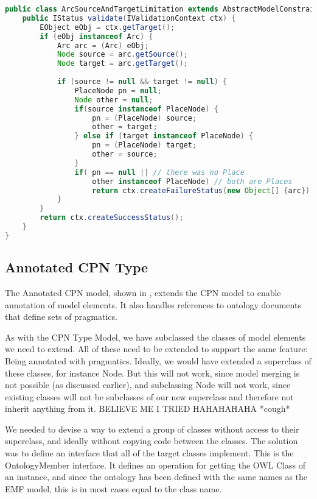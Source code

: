 \begin{lstlisting}[language=Java,label=lst:constraintimpl,float,
caption=Constraint Implementation]
public class ArcSourceAndTargetLimitation extends AbstractModelConstraint {
	public IStatus validate(IValidationContext ctx) {
		EObject eObj = ctx.getTarget();
		if (eObj instanceof Arc) {
			Arc arc = (Arc) eObj;
			Node source = arc.getSource();
			Node target = arc.getTarget();
			
			if (source != null && target != null) {
				PlaceNode pn = null;
				Node other = null;
				if(source instanceof PlaceNode) {
					pn = (PlaceNode) source;
					other = target;
				} else if (target instanceof PlaceNode) {
					pn = (PlaceNode) target;
					other = source;
				}
				if(	pn == null || // there was no Place
					other instanceof PlaceNode) // both are Places
					return ctx.createFailureStatus(new Object[] {arc});
			} 
		} 
		return ctx.createSuccessStatus();
	}
}
\end{lstlisting}

\subsection{Annotated CPN Type}
The Annotated CPN model, shown in , extends the CPN
model to enable annotation of model elements. It also handles references
to ontology documents that define sets of pragmatics.


As with the CPN Type Model, we have subclassed the classes of model elements we
need to extend. All of these need to be extended to support the same feature:
Being annotated with pragmatics. Ideally, we would have extended a superclass of
these classes, for instance Node. But this will not work, since model merging is
not possible (as discussed earlier), and subclassing Node will not work, since
existing classes will not be subclasses of our new superclass and therefore not
inherit anything from it. BELIEVE ME I TRIED HAHAHAHAHA *cough*

We needed to devise a way to extend a group of classes without access to their
superclass, and ideally without copying code between the classes. The solution
was to define an interface that all of the target classes implement. This is the
OntologyMember interface. It defines an operation for getting the OWL Class of
an instance, and since the ontology has been defined with the same names as the
EMF model, this is in most cases equal to the class name. 


